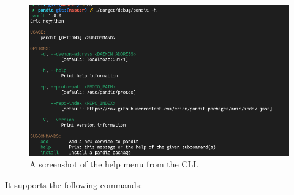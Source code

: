 \documentclass[a4paper,12pt]{report}
\begin{document}
\begin{figure}[hbt!]
    \centering
    \includegraphics[width=\linewidth]{cli1.png}
    \caption{A screenshot of the help menu from the CLI.}
    \label{fig:admin}
\end{figure}

\newpage

It supports the following commands:
\end{document}
